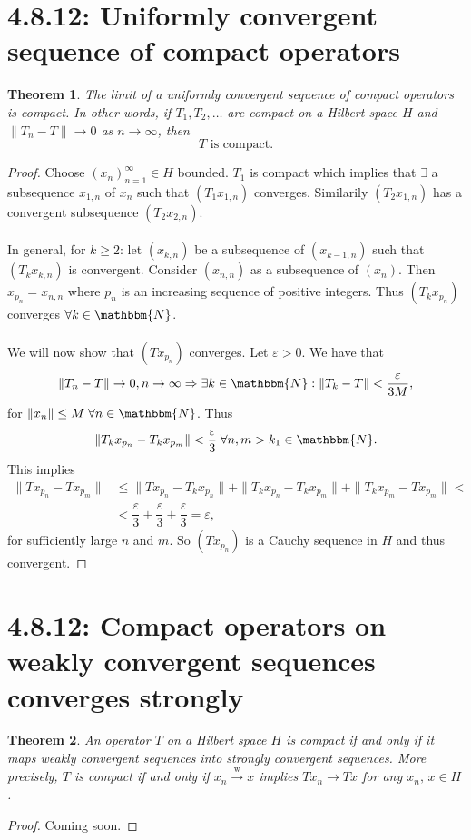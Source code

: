 \documentclass[12pt, a4paper]{article}
\newcommand{\N}{\ensuremath{\mathbbm{N}}}
\newtheorem{theorem}{Theorem}[section]
\begin{document}
\section{4.8.12: Uniformly convergent sequence of compact operators}

\begin{theorem}
The limit of a uniformly convergent sequence of compact operators is compact. In other words, if $T_1, T_2, \dots $ are compact on a Hilbert space $H$ and $\|T_n - T\| \to 0$ as $n\to\infty$, then
\begin{equation*}
T \text{ is compact}.
\end{equation*}
\end{theorem}

\begin{proof}
Choose $(x_n)_{n=1}^\infty\in H$ bounded. $T_1$ is compact which implies that $\exists$ a subsequence $x_{1,n}$ of $x_n$ such that $(T_1x_{1,n})$ converges. Similarily $(T_2x_{1,n})$ has a convergent subsequence $(T_2x_{2,n})$.
\\\\
In general, for $k\geq 2$: let $(x_{k,n})$ be a subsequence of $(x_{k-1, n})$ such that $(T_kx_{k,n})$ is convergent. Consider $(x_{n,n})$ as a subsequence of $(x_n)$. Then $x_{p_n} = x_{n,n}$ where $p_n$ is an increasing sequence of positive integers. Thus $(T_kx_{p_n})$ converges $\forall k\in\N$.
\\\\
We will now show that $(Tx_{p_n})$ converges. Let $\varepsilon>0$. We have that 
\[
\| T_n - T\|\to 0, n \to\infty \Rightarrow \exists k\in \N : \| T_k - T\| < \dfrac{\varepsilon}{3M},
\]
for $\|x_n\|\leq M\; \forall n\in\N$. Thus
\begin{equation*}
\| T_kx_{p_n} - T_kx_{p_m}\| < \dfrac{\varepsilon}{3} \; \forall n,m > k_1\in\N.
\end{equation*}
This implies
\begin{equation*}
\begin{split}
\| Tx_{p_n} - Tx_{p_m}\| &\leq \| Tx_{p_n} - T_kx_{p_n}\| + \| T_kx_{p_n} - T_kx_{p_m}\| + \|T_kx_{p_m}-Tx_{p_m}\| < \\
&< \dfrac{\varepsilon}{3}+\dfrac{\varepsilon}{3}+\dfrac{\varepsilon}{3} = \varepsilon,
\end{split}
\end{equation*}
for sufficiently large $n$ and $m$. So $(Tx_{p_n})$ is a Cauchy sequence in $H$ and thus convergent.
\end{proof}
\section{4.8.12: Compact operators on weakly convergent sequences converges strongly}
\begin{theorem}
An operator $T$ on a Hilbert space $H$ is compact if and only if it maps weakly convergent sequences into strongly convergent sequences. More precisely, $T$ is compact if and only if $x_n\overset{\text{w}}{\to}x$ implies $Tx_n\to Tx$ for any $x_n,\,x\in H$.
\end{theorem}
\begin{proof}
Coming soon.
\end{proof}
\end{document}
